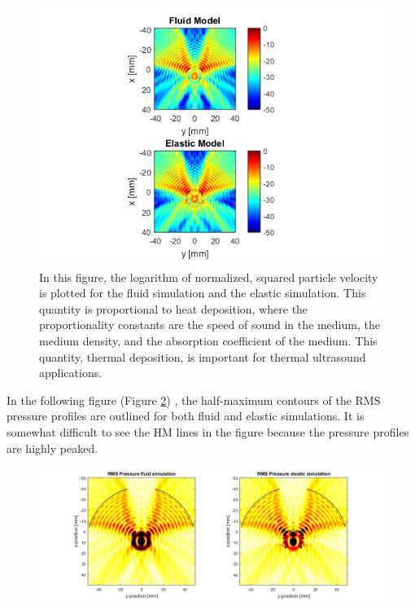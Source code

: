 \documentclass[10pt,a4paper]{article}
\begin{document}
\begin{figure}[H]\label{elasticvsfluid_heatmap}
\centering
\includegraphics[scale=0.7]{circle_elasticvsfluid_heatmap}
\caption{In this figure, the logarithm of normalized, squared particle velocity is plotted for the fluid simulation and the elastic simulation. This quantity is proportional to heat deposition, where the proportionality constants are the speed of sound in the medium, the medium density, and the absorption coefficient of the medium. This quantity, thermal deposition, is important for thermal ultrasound applications.}
\end{figure}

In the following figure (Figure \ref{HM_elasticvsfluid}) , the half-maximum contours of the RMS pressure profiles are outlined for both fluid and elastic simulations. It is somewhat difficult to see the HM lines in the figure because the pressure profiles are highly peaked. 

\begin{figure}[H]\label{HM_elasticvsfluid}
\hspace*{-4cm}                                                    
\includegraphics[scale=0.5]{FWHM_elasticvsfluid}
\end{figure}
\end{document}
